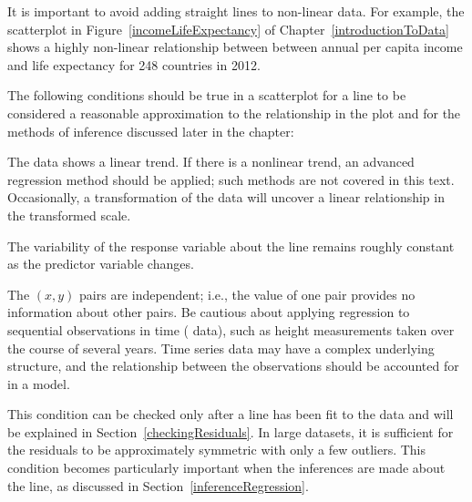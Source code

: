 It is important to avoid adding straight lines to non-linear data. For example, the scatterplot in Figure~\ref{incomeLifeExpectancy} of Chapter~\ref{introductionToData} shows a highly non-linear relationship between between annual per capita income and life expectancy for 248 countries in 2012.

The following conditions should be true in a scatterplot for a line to be considered a reasonable approximation to the relationship in the plot and for the methods of inference discussed later in the chapter:




\begin{description}
\setlength{\itemsep}{0mm}
\item[1 Linearity.] The data shows a linear trend. If there is a nonlinear trend, an advanced regression method should be applied; such methods are not covered in this text.  Occasionally, a transformation of the data will uncover a linear relationship in the transformed scale.
\item[2 Constant variability.] The variability of the response variable about the line remains roughly constant as the predictor variable changes.
\item[3 Independent observations.]  The $(x,y)$ pairs are independent; i.e., the value of one pair provides no information about other pairs. Be cautious about applying regression to sequential observations in time ( data), such as height measurements taken over the course of several years. Time series data may have a complex underlying structure, and the relationship between the observations should be accounted for in a model. 
\item[4 Residuals that are approximately normally distributed.] This condition can be checked only after a line has been fit to the data and will be explained in Section~\ref{checkingResiduals}. In large datasets, it is sufficient for the residuals to be approximately symmetric with only a few outliers. This condition becomes particularly important when the inferences are made about the line, as discussed in Section~\ref{inferenceRegression}.  
\end{description}

